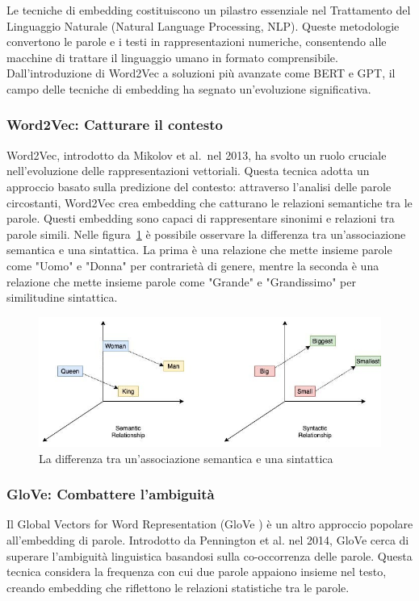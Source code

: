 Le tecniche di embedding costituiscono un pilastro essenziale nel Trattamento del Linguaggio Naturale (Natural Language Processing, NLP). Queste metodologie convertono le parole e i testi in rappresentazioni numeriche, consentendo alle macchine di trattare il linguaggio umano in formato comprensibile. Dall'introduzione di Word2Vec a soluzioni più avanzate come BERT e GPT, il campo delle tecniche di embedding ha segnato un'evoluzione significativa.

\subsubsection{Word2Vec: Catturare il contesto}
Word2Vec, introdotto da Mikolov et al.\ nel 2013\cite{w2v}, ha svolto un ruolo cruciale nell'evoluzione delle rappresentazioni vettoriali. Questa tecnica adotta un approccio basato sulla predizione del contesto: attraverso l'analisi delle parole circostanti, Word2Vec crea embedding che catturano le relazioni semantiche tra le parole. Questi embedding sono capaci di rappresentare sinonimi e relazioni tra parole simili.
Nelle figura~\ref{fig:semanticandsintatic} è possibile osservare la differenza tra un'associazione semantica e una sintattica. La prima è una relazione che mette insieme parole come "Uomo" e "Donna" per contrarietà di genere, mentre la seconda è una relazione che mette insieme parole come "Grande" e "Grandissimo" per similitudine sintattica.
\begin{center}
    \begin{figure}[H]
        \includegraphics[width=0.6\pdfpagewidth]{images/semanticandsintatic.jpg}
        \caption{La differenza tra un'associazione semantica e una sintattica}
        \label{fig:semanticandsintatic}
    \end{figure}    
\end{center}

\subsubsection{GloVe: Combattere l'ambiguità}
Il Global Vectors for Word Representation (GloVe \cite{glove}) è un altro approccio popolare all'embedding di parole. Introdotto da Pennington et al. nel 2014, GloVe cerca di superare l'ambiguità linguistica basandosi sulla co-occorrenza delle parole. Questa tecnica considera la frequenza con cui due parole appaiono insieme nel testo, creando embedding che riflettono le relazioni statistiche tra le parole.

